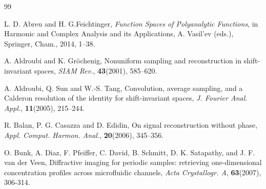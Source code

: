 \documentclass[11pt,oneside,reqno]{amsart}
\numberwithin{equation}{section}
\begin{document}
\medskip 


\begin{thebibliography}{99}

L. D. Abreu and H. G.Feichtinger,  \emph{Function Spaces of Polyanalytic Functions}, in Harmonic and Complex Analysis and its Applications,
A. Vasil'ev (eds.),
Springer, Cham., 2014, 1--38.

A. Aldroubi and K. Gr\"ochenig,
Nonuniform sampling  and reconstruction in shift-invariant spaces, {\em SIAM
Rev.}, {\bf 43}(2001),  585--620.



A. Aldroubi, Q. Sun and W.-S. Tang,
Convolution, average sampling, and  a Calderon
resolution  of the identity for shift-invariant spaces, {\em J. Fourier Anal. Appl.},
{\bf 11}(2005), 215--244.



R. Balan, P. G.  Casazza  and D. Edidin, On   signal  reconstruction without phase, {\em Appl. Comput. Harmon. Anal.}, {\bf 20}(2006), 345--356.

	
	O. Bunk, A. Diaz, F. Pfeiffer, C. David, B. Schmitt, D. K. Satapathy, and J. F. van der Veen, Diffractive imaging for periodic samples: retrieving one-dimensional concentration profiles across microfluidic channels, \emph{Acta Crystallogr. A}, {\bf 63}(2007), 306-314.
	















\end{thebibliography}
\end{document}
